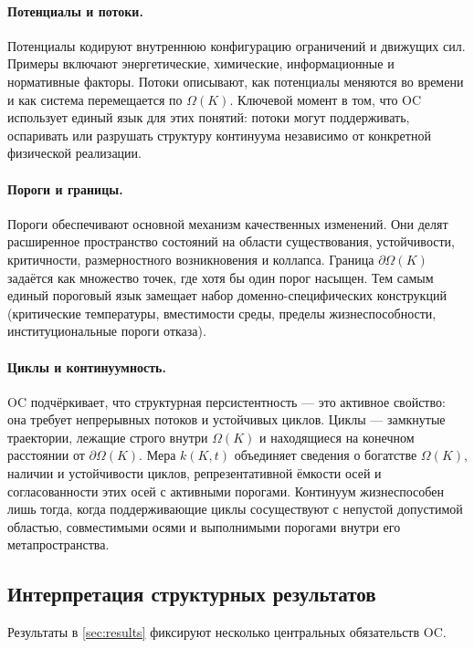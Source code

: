 \paragraph{Потенциалы и потоки.}
Потенциалы кодируют внутреннюю конфигурацию ограничений и движущих сил.
Примеры включают энергетические, химические, информационные и нормативные
факторы.
Потоки описывают, как потенциалы меняются во времени и как система перемещается
по \(\Omega(K)\).
Ключевой момент в том, что OC использует единый язык для этих понятий:
потоки могут поддерживать, оспаривать или разрушать структуру континуума независимо
от конкретной физической реализации.

\paragraph{Пороги и границы.}
Пороги обеспечивают основной механизм качественных изменений.
Они делят расширенное пространство состояний на области существования, устойчивости,
критичности, размерностного возникновения и коллапса.
Граница \(\partial\Omega(K)\) задаётся как множество точек, где хотя бы один порог
насыщен.
Тем самым единый пороговый язык замещает набор доменно-специфических конструкций
(критические температуры, вместимости среды, пределы жизнеспособности,
институциональные пороги отказа).

\paragraph{Циклы и континуумность.}
OC подчёркивает, что структурная персистентность — это активное свойство:
она требует непрерывных потоков и устойчивых циклов.
Циклы — замкнутые траектории, лежащие строго внутри \(\Omega(K)\) и находящиеся на
конечном расстоянии от \(\partial\Omega(K)\).
Мера \(k(K,t)\) объединяет сведения о богатстве \(\Omega(K)\), наличии и устойчивости
циклов, репрезентативной ёмкости осей и согласованности этих осей с активными порогами.
Континуум жизнеспособен лишь тогда, когда поддерживающие циклы сосуществуют с
непустой допустимой областью, совместимыми осями и выполнимыми порогами внутри
его метапространства.

\subsection{Интерпретация структурных результатов}

Результаты в \cref{sec:results} фиксируют несколько центральных обязательств OC.

